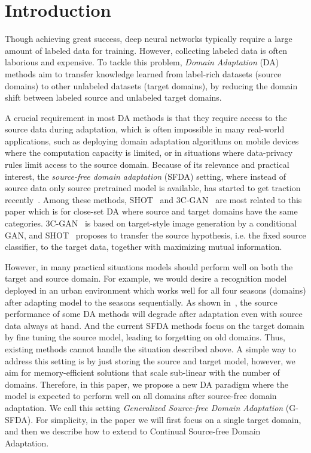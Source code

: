 \documentclass[10pt,twocolumn,letterpaper]{article}
\begin{document}
\section{Introduction}
Though achieving great success, deep neural networks typically require a large amount of labeled data for training. However, collecting labeled data is often laborious and expensive. To tackle this problem, \textit{Domain Adaptation} (DA) methods aim to transfer knowledge learned from label-rich datasets (source domains) to other unlabeled datasets (target domains), by reducing the domain shift between labeled source and unlabeled target domains. 



A crucial requirement in most DA methods is that they require access to the source data during adaptation, which is often impossible in many real-world applications, such as deploying domain adaptation algorithms on mobile devices where the computation capacity is limited, or in situations where data-privacy rules limit access to the source domain. Because of its relevance and practical interest, the \textit{source-free domain adaptation} (SFDA) setting, where instead of source data only source pretrained model is available, has started to get traction recently~\cite{kundu2020universal, kundu2020towards, li2020model, liang2020we,  yang2020unsupervised}. Among these methods, SHOT~\cite{liang2020we} and 3C-GAN~\cite{li2020model} are most related to this paper which is for close-set DA where source and target domains have the same categories. 3C-GAN~\cite{li2020model} is based on target-style image generation by a conditional GAN, and SHOT~\cite{liang2020we} proposes to transfer the source hypothesis, i.e. the fixed source classifier, to the target data, together with maximizing mutual information.

However, in many practical situations models should perform well on both the target and source domain. For example, we would desire a recognition model deployed in an urban environment which works well for all four seasons (domains) after adapting model to the seasons sequentially. As shown in~\cite{ye2020light}, the source performance of some DA methods will degrade after adaptation even with source data always at hand. And the current SFDA methods focus on the target domain by fine tuning the source model, leading to forgetting on old domains. Thus, existing methods cannot handle the situation described above.
{A simple way to address this setting is by just storing the source and target model, however, we aim for memory-efficient solutions that scale sub-linear with the number of domains.} Therefore, in this paper, we propose a new DA paradigm where the model is expected to perform well on all domains after source-free domain adaptation. We call this setting \textit{Generalized Source-free Domain Adaptation} (G-SFDA). For simplicity, in the paper we will first focus on a single target domain, and then we describe how to extend to Continual Source-free Domain Adaptation. 
\end{document}
